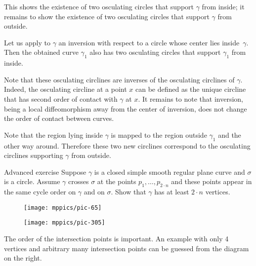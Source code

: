 \documentclass{article}
\begin{document}
This shows the existence of two osculating circles that support $\gamma$ from inside;
it remains to show the existence of two osculating circles that support $\gamma$ from outside.

Let us apply to $\gamma$ an inversion with respect to a circle whose center lies inside~$\gamma$.
Then the obtained curve $\gamma_1$ also has  two osculating circles that support $\gamma_1$ from inside.

Note that these osculating circlines are inverses of the osculating circlines of $\gamma$.
Indeed, the osculating circline at a point $x$ can be defined as the unique circline that has second order of contact with $\gamma$ at $x$.
It remains to note that inversion, being a local diffeomorphism away from the center of inversion, does not change the order of contact between curves.

Note that the region lying inside $\gamma$ is mapped to the region outside $\gamma_1$ and the other way around.
Therefore these two new circlines correspond to the osculating circlines supporting $\gamma$ from outside.
\qeds

\begin{thm}{Advanced exercise}\label{ex:curve-crosses-circle}
Suppose $\gamma$ is a closed simple smooth regular plane curve and $\sigma$ is a circle.
Assume $\gamma$ crosses $\sigma$ at the points $p_1,\dots,p_{2{\cdot} n}$ and these points appear in the same cycle order on $\gamma$ and on $\sigma$.
Show that $\gamma$ has at least $2\cdot n$ vertices.
\end{thm}


\begin{figure}[!ht]
\begin{minipage}{.48\textwidth}
\centering
\texttt{[image: mppics/pic-65]}
\end{minipage}\hfill
\begin{minipage}{.48\textwidth}
\centering
\texttt{[image: mppics/pic-305]}
\end{minipage}
\end{figure}

The order of the intersection points is important. 
An example with only 4 vertices and arbitrary many intersection points can be guessed from the diagram on the right. 



\sloppy
\printbibliography[heading=bibintoc]
\fussy
\end{document}
